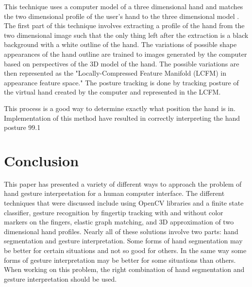 \documentclass[a4paper,12pt]{report}
\begin{document}
This technique uses a computer model of a three dimensional hand and matches the two dimensional profile of the user's hand to the three dimensional model \cite{3d}. The first part of this technique involves extracting a profile of the hand from the two dimensional image such that the only thing left after the extraction is a black background with a white outline of the hand. The variations of possible shape appearances of the hand outline are trained to images generated by the computer based on perspectives of the 3D model of the hand. The possible variations are then represented as the "Locally-Compressed Feature Manifold (LCFM) in appearance feature space." \cite{3} \cite{4} The posture tracking is done by tracking posture of the virtual hand created by the computer and represented in the LCFM. 

This process is a good way to determine exactly what position the hand is in. Implementation of this method have resulted in correctly interpreting the hand posture 99.1%

\section{Conclusion}

This paper has presented a variety of different ways to approach the problem of hand gesture interpretation for a human computer interface. The different techniques that were discussed include using OpenCV libraries and a finite state classifier, gesture recognition by fingertip tracking with and without color markers on the fingers, elastic graph matching, and 3D approximation of two dimensional hand profiles. Nearly all of these solutions involve two parts: hand segmentation and gesture interpretation.  Some forms of hand segmentation may be better for certain situations and not so good for others. In the same way some forms of gesture interpretation may be better for some situations than others. When working on this problem, the right combination of hand segmentation and gesture interpretation should be used.   






\end{document}
